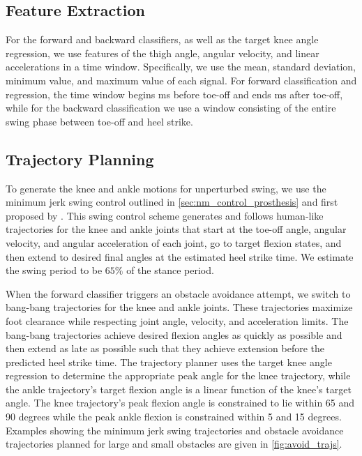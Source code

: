 \subsection{Feature Extraction}
For the forward and backward classifiers, as well as the target knee angle
regression, we use features of the thigh angle, angular velocity, and linear
accelerations in a time window. Specifically, we use the mean, standard
deviation, minimum value, and maximum value of each signal. For forward
classification and regression, the time window begins \unit[210]{ms} before
toe-off and ends \unit[90]{ms} after toe-off, while for the backward
classification we use a window consisting of the entire swing phase between
toe-off and heel strike.

\subsection{Trajectory Planning}

To generate the knee and ankle motions for unperturbed swing, we use the minimum
jerk swing control outlined in \cref{sec:nm_control_prosthesis} and first
proposed by \citet{lenzi2014speed}. This swing control scheme generates and
follows human-like trajectories for the knee and ankle joints that start at the
toe-off angle, angular velocity, and angular acceleration of each joint, go to
target flexion states, and then extend to desired final angles at the estimated
heel strike time. We estimate the swing period to be $65\%$ of the stance
period.

When the forward classifier triggers an obstacle avoidance attempt, we switch to
bang-bang trajectories for the knee and ankle joints. These trajectories
maximize foot clearance while respecting joint angle, velocity, and acceleration
limits. The bang-bang trajectories achieve desired flexion angles as quickly as
possible and then extend as late as possible such that they achieve extension
before the predicted heel strike time. The trajectory planner uses the target
knee angle regression to determine the appropriate peak angle for the knee
trajectory, while the ankle trajectory's target flexion angle is a linear
function of the knee's target angle. The knee trajectory's peak flexion angle is
constrained to lie within 65 and 90 degrees while the peak ankle flexion is
constrained within 5 and 15 degrees. Examples showing the minimum jerk swing
trajectories and obstacle avoidance trajectories planned for large and small
obstacles are given in \cref{fig:avoid_trajs}.

